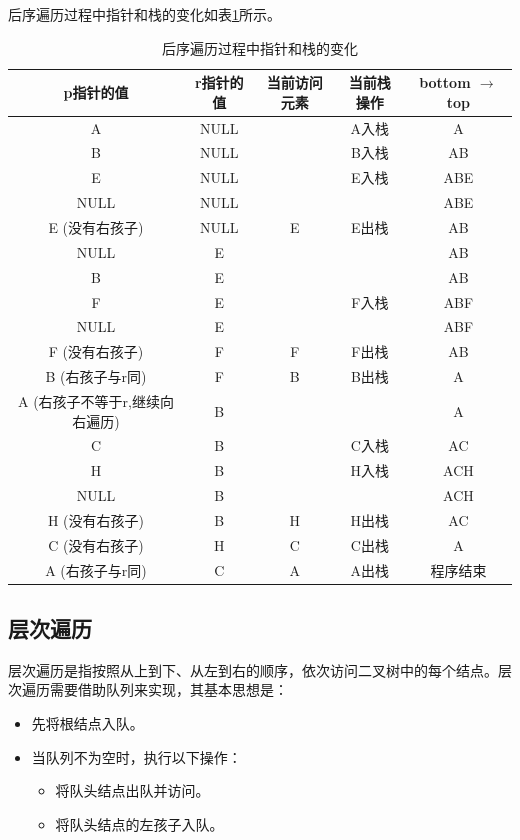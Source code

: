 \documentclass[lang=cn,newtx,10pt,scheme=chinese]{../elegantbook}
\begin{document}
后序遍历过程中指针和栈的变化如表\ref{tab:postorder_stack}所示。
\begin{table}[!htbp]
  \centering
  \caption{后序遍历过程中指针和栈的变化}
  \begin{tabular}{|c|c|c|c|c|}
  \hline
  \textbf{p指针的值} & \textbf{r指针的值} & \textbf{当前访问元素} & \textbf{当前栈操作} & \textbf{bottom $\to$ top} \\ \hline
  A & NULL &  & A入栈 & A \\ \hline
  B & NULL &  & B入栈 & AB \\ \hline
  E & NULL &  & E入栈 & ABE \\ \hline
  NULL & NULL &  &  & ABE \\ \hline
  E (没有右孩子) & NULL & E & E出栈 & AB \\ \hline
  NULL & E &  &  & AB \\ \hline
  B & E &  &  & AB \\ \hline
  F & E &  & F入栈 & ABF \\ \hline
  NULL & E &  &  & ABF \\ \hline
  F (没有右孩子) & F & F & F出栈 & AB \\ \hline
  B (右孩子与r同) & F & B & B出栈 & A \\ \hline
  A (右孩子不等于r,继续向右遍历) & B &  &  & A \\ \hline
  C & B &  & C入栈 & AC \\ \hline
  H & B &  & H入栈 & ACH \\ \hline
  NULL & B &  &  & ACH \\ \hline
  H (没有右孩子) & B & H & H出栈 & AC \\ \hline
  C (没有右孩子) & H & C & C出栈 & A \\ \hline
  A (右孩子与r同) & C & A & A出栈 & 程序结束 \\ \hline
  \end{tabular}
  \label{tab:postorder_stack}
  \end{table}
\subsection{层次遍历}

层次遍历是指按照从上到下、从左到右的顺序，依次访问二叉树中的每个结点。层次遍历需要借助队列来实现，其基本思想是：

\begin{itemize}
  \item 先将根结点入队。
  \item 当队列不为空时，执行以下操作：
  \begin{itemize}
    \item 将队头结点出队并访问。
    \item 将队头结点的左孩子入队。
  \end{itemize}
\end{itemize}
\end{document}

